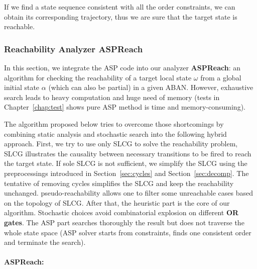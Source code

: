 If we find a state sequence consistent with all the order constraints, we can obtain its corresponding trajectory, thus we are sure that the target state is reachable.
\subsubsection{Reachability Analyzer ASPReach}
In this section, we integrate the ASP code into our analyzer \textbf{ASPReach}: an algorithm for checking the reachability of a target local state $\omega$ from a global initial state $\alpha$ (which can also be partial) in a given ABAN.
However, exhaustive search leads to heavy computation and huge need of memory (tests in Chapter~\ref{chap:test} shows pure ASP method is time and memory-consuming).

The algorithm proposed below tries to overcome those shortcomings by combining static analysis and stochastic search into the following hybrid approach.
First, we try to use only SLCG to solve the reachability problem, SLCG illustrates the causality between necessary transitions to be fired to reach the target state.
If sole SLCG is not sufficient, we simplify the SLCG using the preprocessings introduced in Section~\ref{sec:cycles} and Section~\ref{sec:decomp}. 
The tentative of removing cycles simplifies the SLCG and keep the reachability unchanged. 
pseudo-reachability allows one to filter some unreachable cases based on the topology of SLCG. 
After that, the heuristic part is the core of our algorithm.
Stochastic choices avoid combinatorial explosion on different \textbf{OR gates}.
The ASP part searches thoroughly the result but does not traverse the whole state space (ASP solver starts from constraints, finds one consistent order and terminate the search). 


\paragraph{{\bf ASPReach}:}


